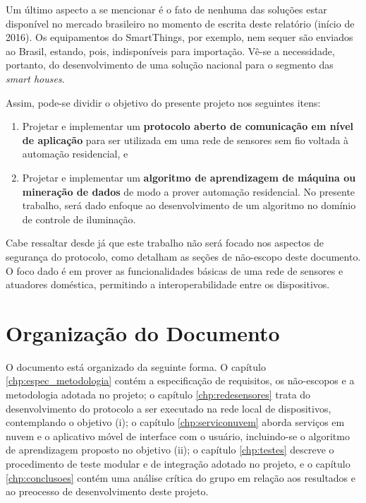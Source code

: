Um último aspecto a se mencionar é o fato de nenhuma das soluções estar disponível no mercado brasileiro no momento de escrita deste relatório (início de 2016). Os equipamentos do SmartThings, por exemplo, nem sequer são enviados ao Brasil, estando, pois, indisponíveis para importação. Vê-se a necessidade, portanto, do desenvolvimento de uma solução nacional para o segmento das \textit{smart houses}.

Assim, pode-se dividir o objetivo do presente projeto nos seguintes itens:
\begin{enumerate}[\quad (i)]
	\item Projetar e implementar um \textbf{protocolo aberto de comunicação em nível de aplicação} para ser utilizada em uma rede de sensores sem fio voltada à automação residencial, e
	\item Projetar e implementar um \textbf{algoritmo de aprendizagem de máquina ou mineração de dados} de modo a prover automação residencial. No presente trabalho, será dado enfoque ao desenvolvimento de um algoritmo no domínio de controle de iluminação.
\end{enumerate}

Cabe ressaltar desde já que este trabalho não será focado nos aspectos de segurança do protocolo, como detalham as seções de não-escopo deste documento. O foco dado é em prover as funcionalidades básicas de uma rede de sensores e atuadores doméstica, permitindo a interoperabilidade entre os dispositivos.

\section{Organização do Documento}
O documento está organizado da seguinte forma. O capítulo \ref{chp:espec_metodologia} contém a especificação de requisitos, os não-escopos e a metodologia adotada no projeto; o capítulo \ref{chp:redesensores} trata do desenvolvimento do protocolo a ser executado na rede local de dispositivos, contemplando o objetivo (i); o capítulo \ref{chp:serviconuvem} aborda serviços em nuvem e o aplicativo móvel de interface com o usuário, incluindo-se o algoritmo de aprendizagem proposto no objetivo (ii); o capítulo \ref{chp:testes} descreve o procedimento de teste modular e de integração adotado no projeto, e o capítulo \ref{chp:conclusoes} contém uma análise crítica do grupo em relação aos resultados e ao preocesso de desenvolvimento deste projeto.